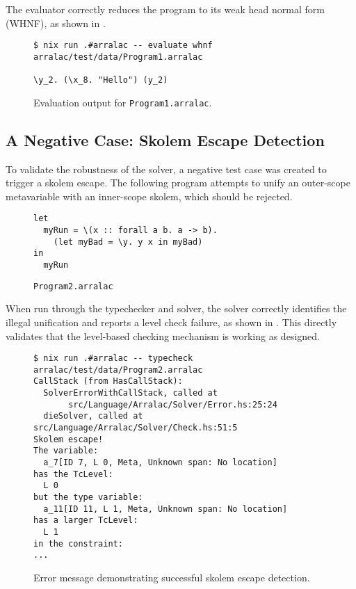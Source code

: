 The evaluator correctly reduces the program to its weak head normal form (WHNF), as shown in .

\begin{figure}[h]
    \centering
    \begin{verbatim}
$ nix run .#arralac -- evaluate whnf arralac/test/data/Program1.arralac

\y_2. (\x_8. "Hello") (y_2)
\end{verbatim}
    \caption{Evaluation output for \texttt{Program1.arralac}.}
    \label{fig:evaluate-output}
\end{figure}

\subsection{A Negative Case: Skolem Escape Detection}
To validate the robustness of the solver, a negative test case was created to trigger a skolem escape. The following program attempts to unify an outer-scope metavariable with an inner-scope skolem, which should be rejected.

\begin{figure}
    \centering
    \begin{verbatim}
let 
  myRun = \(x :: forall a b. a -> b). 
    (let myBad = \y. y x in myBad)
in
  myRun
\end{verbatim}
    \caption{\texttt{Program2.arralac}}
\end{figure}

\newpage
When run through the typechecker and solver, the solver correctly identifies the illegal unification and reports a level check failure, as shown in . This directly validates that the level-based checking mechanism is working as designed.

\begin{figure}[h]
    \centering
    \begin{verbatim}
$ nix run .#arralac -- typecheck arralac/test/data/Program2.arralac
CallStack (from HasCallStack):
  SolverErrorWithCallStack, called at
       src/Language/Arralac/Solver/Error.hs:25:24
  dieSolver, called at src/Language/Arralac/Solver/Check.hs:51:5
Skolem escape!
The variable:
  a_7[ID 7, L 0, Meta, Unknown span: No location]
has the TcLevel:
  L 0
but the type variable:
  a_11[ID 11, L 1, Meta, Unknown span: No location]
has a larger TcLevel:
  L 1
in the constraint:
...
\end{verbatim}
    \caption{Error message demonstrating successful skolem escape detection.}
    \label{fig:skolem-escape-error}
\end{figure}

